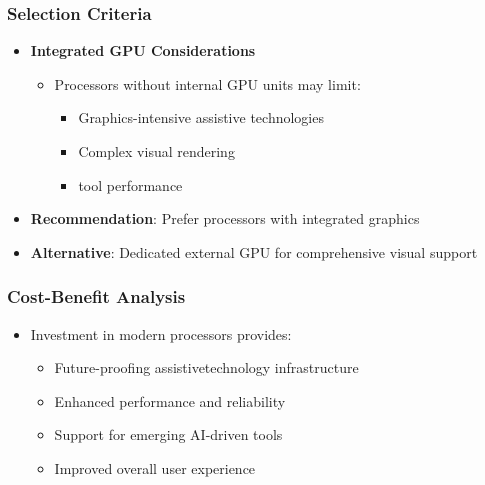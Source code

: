 \subsubsection{ Selection Criteria}

\begin{itemize}
	\item \textbf{Integrated GPU Considerations}

	      \begin{itemize}
		      \item Processors without internal GPU units may limit:

		            \begin{itemize}
			            \item Graphics-intensive assistive technologies \supercite{GPUforAssistiveTech}
			            \item Complex visual rendering \supercite{GPUforAssistiveTech}
			            \item {} tool performance \supercite{GPUforAssistiveTech}
		            \end{itemize}

	      \end{itemize}

\end{itemize}

\begin{itemize}
	\item \textbf{Recommendation}: Prefer processors with integrated graphics \supercite{IntelIntegratedGraphics}
	\item \textbf{Alternative}: Dedicated external GPU for comprehensive visual support \supercite{ExternalGPUAssistiveTech}
\end{itemize}


\subsubsection{Cost-Benefit Analysis}

\begin{itemize}
	\item Investment in modern processors provides:
	      \begin{itemize}
		      \item Future-proofing \gls{assistivetechnology} infrastructure \supercite{FutureProofingTech}
		      \item Enhanced performance and reliability \supercite{ModernProcessorBenefits}
		      \item Support for emerging AI-driven  tools \supercite{AIinAccessibility}
		      \item Improved overall user experience \supercite{UserExperienceImprovements}
	      \end{itemize}
\end{itemize}


